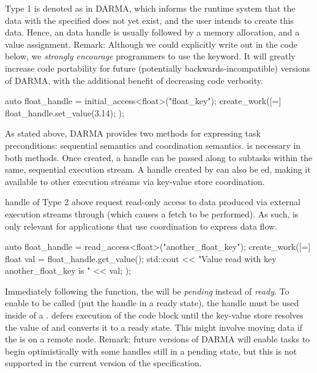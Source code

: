 Type 1 is denoted as  in \gls{DARMA}, 
which informs the \gls{runtime system} that the data with the 
specified  does not yet exist, and the user intends to 
create this data.%
Hence, an  data \gls{handle} is usually 
followed by a memory allocation, and a value assignment. 
Remark: Although we could explicitly write out \ahandleT in the code below,
we \emph{strongly encourage} programmers to use the \CC{}  keyword.
It will greatly increase code portability for future (potentially
backwards-incompatible) versions of \gls{DARMA},
with the additional benefit of decreasing code verbosity.

\begin{CppCode}
auto float_handle = initial_access<float>("float_key");
create_work([=]{
  float_handle.set_value(3.14);
});
\end{CppCode}
As stated above, \gls{DARMA} provides two methods for expressing \gls{task}
\glspl{precondition}: \gls{sequential semantics} and \gls{coordination
semantics}.   is necessary in both methods.
Once created, a \gls{handle} can be passed along to \glspl{subtask} within the same,
sequential \gls{execution stream}.
A \gls{handle} created by  can also be ed,
making it available to other \glspl{execution stream} via \gls{key-value store} coordination.

\Gls{handle} of Type 2 above request read-only access to data produced via
external \glspl{execution stream} through  (which causes
a \gls{fetch} to be performed). 
As such,  is only relevant for applications that use coordination to express data flow.
\begin{CppCode}
auto float_handle = read_access<float>("another_float_key");
create_work([=]{
  float val = float_handle.get_value();
  std::cout << "Value read with key another_float_key is " << val;  
});
\end{CppCode}

Immediately following the  function, the \ahandle will be
\emph{pending} instead of \emph{ready}.
To enable  to be called (put the \gls{handle} in a
ready state), the \gls{handle} must be used inside of a .
\cwork defers execution of the code block until the \gls{key-value store}
resolves the value of  and converts it to a
ready state.  This might involve moving data if the  is on a remote node.
Remark: future versions of \gls{DARMA} will enable \glspl{task} to begin
optimistically with some \glspl{handle} still in a pending state, but
this is not supported in the current version of the specification.

